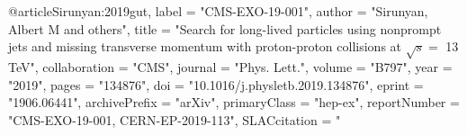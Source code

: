 @article{Sirunyan:2019gut,
      label          = "CMS-EXO-19-001",
      author         = "Sirunyan, Albert M and others",
      title          = "{Search for long-lived particles using nonprompt jets and
                        missing transverse momentum with proton-proton collisions
                        at $\sqrt{s} =$ 13 TeV}",
      collaboration  = "CMS",
      journal        = "Phys. Lett.",
      volume         = "B797",
      year           = "2019",
      pages          = "134876",
      doi            = "10.1016/j.physletb.2019.134876",
      eprint         = "1906.06441",
      archivePrefix  = "arXiv",
      primaryClass   = "hep-ex",
      reportNumber   = "CMS-EXO-19-001, CERN-EP-2019-113",
      SLACcitation   = "%
}

